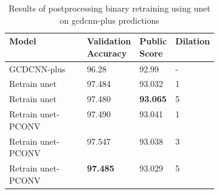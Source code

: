  
\begin{table}[H]
    \centering
    \begin{tabular}{l|p{0.15\linewidth}|p{0.15\linewidth}|p{0.10\linewidth}}
        Model & Validation Accuracy & Public Score & Dilation\\ \hline
        GCDCNN-plus&  96.28 & 92.99 & -\\\hline %
        Retrain \acrshort{unet} &  97.484 & 93.032 & 1\\ %
        Retrain \acrshort{unet}  & 97.480  & \textbf{93.065} & 5\\ %
        \hline
        Retrain \acrshort{unet}-PCONV & 97.490 & 93.041 & 1\\ %
        Retrain \acrshort{unet}-PCONV &  97.547 & 93.038 & 3\\ %
        Retrain \acrshort{unet}-PCONV & \textbf{97.485} & 93.029 & 5\\ %
    \end{tabular}
    \caption{Results of postprocessing binary retraining using \acrshort{unet} on \acrshort{gcdcnn}-plus predictions}
    \label{tab:postprocessinggcdcnn}
\end{table}



